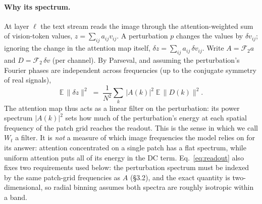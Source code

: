 \paragraph{Why its spectrum.}
At layer $\ell$ the text stream reads the image through the
attention-weighted sum of vision-token values,
$z=\sum_{ij}a_{ij}v_{ij}$. A perturbation $p$ changes the values by
$\delta v_{ij}$; ignoring the change in the attention map itself,
$\delta z=\sum_{ij}a_{ij}\,\delta v_{ij}$. Write $A=\mathcal{F}_2 a$ and
$D=\mathcal{F}_2\,\delta v$ (per channel). By Parseval, and assuming the
perturbation's Fourier phases are independent across frequencies (up to
the conjugate symmetry of real signals),
\begin{equation}
  \mathbb{E}\,\|\delta z\|^2
  \;=\; \frac{1}{N^2}\sum_{k}\,|A(k)|^2\;\mathbb{E}\,\|D(k)\|^2 .
  \label{eq:readout}
\end{equation}
The attention map thus acts as a linear filter on the perturbation: its
power spectrum $|A(k)|^2$ sets how much of the perturbation's energy at
each spatial frequency of the patch grid reaches the readout. This is
the sense in which we call $W_t$ a filter. It is \emph{not} a measure of
which image frequencies the model relies on for its answer: attention
concentrated on a single patch has a flat spectrum, while uniform
attention puts all of its energy in the DC term. Eq.~\eqref{eq:readout}
also fixes two requirements used below: the perturbation spectrum must
be indexed by the same patch-grid frequencies as $A$ (\S3.2), and the
exact quantity is two-dimensional, so radial binning assumes both
spectra are roughly isotropic within a band.


